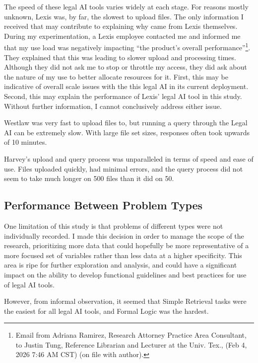 \documentclass[
]{article}
\begin{document}
The speed of these legal AI tools varies widely at each stage. For
reasons mostly unknown, Lexis was, by far, the slowest to upload files.
The only information I received that may contribute to explaining why
came from Lexis themselves. During my experimentation, a Lexis employee
contacted me and informed me that my use load was negatively impacting
``the product's overall performance''\footnote{Email from Adriana
  Ramirez, Research Attorney Practice Area Consultant, to Justin Tung,
  Reference Librarian and Lecturer at the Univ. Tex., (Feb 4, 2026 7:46
  AM CST) (on file with author).}. They explained that this was leading
to slower upload and processing times. Although they did not ask me to
stop or throttle my access, they did ask about the nature of my use to
better allocate resources for it. First, this may be indicative of
overall scale issues with the this legal AI in its current deployment.
Second, this may explain the performance of Lexis' legal AI tool in this
study. Without further information, I cannot conclusively address either
issue.

Westlaw was very fast to upload files to, but running a query through
the Legal AI can be extremely slow. With large file set sizes, responses
often took upwards of 10 minutes.

Harvey's upload and query process was unparalleled in terms of speed and
ease of use. Files uploaded quickly, had minimal errors, and the query
process did not seem to take much longer on 500 files than it did on 50.

\subsection{Performance Between Problem
Types}\label{performance-between-problem-types}

One limitation of this study is that problems of different types were
not individually recorded. I made this decision in order to manage the
scope of the research, prioritizing more data that could hopefully be
more representative of a more focused set of variables rather than less
data at a higher specificity. This area is ripe for further exploration
and analysis, and could have a significant impact on the ability to
develop functional guidelines and best practices for use of legal AI
tools.

However, from informal observation, it seemed that Simple Retrieval
tasks were the easiest for all legal AI tools, and Formal Logic was the
hardest.
\end{document}
